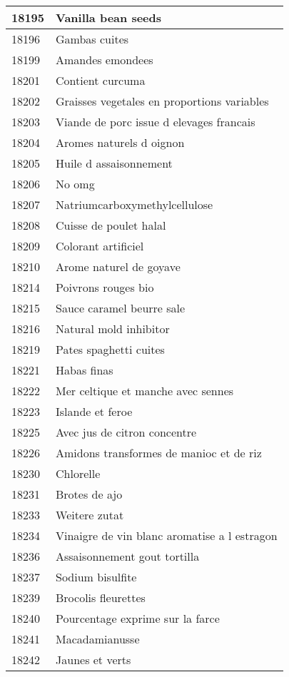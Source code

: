 \begin{longtable}{|l|l|}
18195 & Vanilla bean seeds \\ \hline 
18196 & Gambas cuites \\ \hline 
18199 & Amandes emondees \\ \hline 
18201 & Contient curcuma \\ \hline 
18202 & Graisses vegetales en proportions variables \\ \hline 
18203 & Viande de porc issue d elevages francais \\ \hline 
18204 & Aromes naturels d oignon \\ \hline 
18205 & Huile d assaisonnement \\ \hline 
18206 & No omg \\ \hline 
18207 & Natriumcarboxymethylcellulose \\ \hline 
18208 & Cuisse de poulet halal \\ \hline 
18209 & Colorant artificiel \\ \hline 
18210 & Arome naturel de goyave \\ \hline 
18214 & Poivrons rouges bio \\ \hline 
18215 & Sauce caramel beurre sale \\ \hline 
18216 & Natural mold inhibitor \\ \hline 
18219 & Pates spaghetti cuites \\ \hline 
18221 & Habas finas \\ \hline 
18222 & Mer celtique et manche avec sennes \\ \hline 
18223 & Islande et feroe \\ \hline 
18225 & Avec jus de citron concentre \\ \hline 
18226 & Amidons transformes de manioc et de riz \\ \hline 
18230 & Chlorelle \\ \hline 
18231 & Brotes de ajo \\ \hline 
18233 & Weitere zutat \\ \hline 
18234 & Vinaigre de vin blanc aromatise a l estragon \\ \hline 
18236 & Assaisonnement gout tortilla \\ \hline 
18237 & Sodium bisulfite \\ \hline 
18239 & Brocolis fleurettes \\ \hline 
18240 & Pourcentage exprime sur la farce \\ \hline 
18241 & Macadamianusse \\ \hline 
18242 & Jaunes et verts \\ \hline 

\end{longtable}
